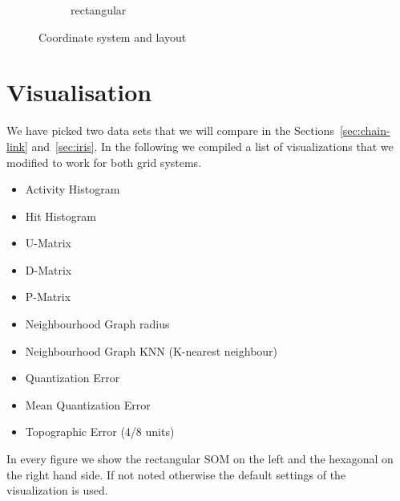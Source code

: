 \documentclass{acm_proc_article-sp}
\begin{document}
\begin{figure}
\begin{subfigure}{1\linewidth}
    \caption{rectangular}
    \label{fig:hci-coord-rect}
    \end{subfigure}
    \caption{Coordinate system and layout}
    \label{fig:coord}
\end{figure}

\section{Visualisation}

We have picked two data sets that we will compare in the Sections~\ref{sec:chain-link} and~\ref{sec:iris}. In the following we compiled a list of visualizations that we modified to work for both grid systems.

\begin{itemize}
	\item Activity Histogram
	\item Hit Histogram
	\item U-Matrix
	\item D-Matrix
	\item P-Matrix
	\item Neighbourhood Graph radius
	\item Neighbourhood Graph KNN (K-nearest neighbour)

	\item Quantization Error
	\item Mean Quantization Error
	\item Topographic Error (4/8 units)
\end{itemize}

In every figure we show the rectangular SOM on the left and the hexagonal on the right hand side.
If not noted otherwise the default settings of the visualization is used.

\newcommand{\cmprecthex}[5]
{
	\begin{figure}
		\begin{subfigure}{0.49\linewidth}
			\texttt{[image: img/\#1-\#2]}
			\caption{#5}
			\label{fig:#1-#2-rect}
		\end{subfigure}
		\begin{subfigure}{0.49\linewidth}
			\texttt{[image: img/\#1-\#2-hex]}
			\caption{#4}
			\label{fig:#1-#2-hex}
		\end{subfigure}
		\caption{#3}
		\label{fig:#1-#2}
	\end{figure}
}
\end{document}
